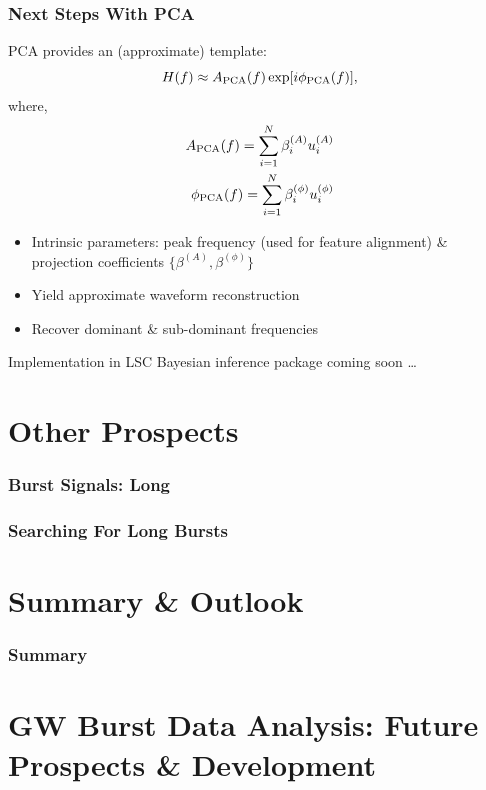 \documentclass[serif,mathserif,10pt]{beamer}
\let\oldframetitle\frametitle%
\renewcommand{\frametitle}[1]{%
      \oldframetitle{#1}\setstretch{1.2}}
\begin{document}
\begin{frame}
    \frametitle{Next Steps With PCA}

    PCA provides an (approximate) template:
    \begin{equation}
        H(f) \approx A_{\rm PCA}(f) \exp [i \phi_{\rm PCA}(f)],
    \end{equation}
    where,
    \begin{eqnarray}
        A_{\rm PCA}(f) = \sum_{i=1}^N \beta_i^{(A)}u_i^{(A)} \\ \nonumber
        \phi_{\rm PCA}(f) = \sum_{i=1}^N \beta_i^{(\phi)}u_i^{(\phi)} 
    \end{eqnarray}

    \begin{itemize}
        \item Intrinsic parameters: peak frequency (used for feature alignment)
            \& projection coefficients $\{\beta^{(A)}, \beta^{(\phi)}\}$
        \item Yield approximate waveform reconstruction \\
        \item Recover dominant \& sub-dominant frequencies \\
    \end{itemize}

    Implementation in LSC Bayesian inference package coming soon \dots

\end{frame}

\section{Other Prospects}

\begin{frame}
    \frametitle{Burst Signals: Long}
\end{frame}


\begin{frame}
    \frametitle{Searching For Long Bursts}
\end{frame}

\section{Summary \& Outlook}
\begin{frame}
    \frametitle{Summary}
\end{frame}

\appendix
\section{GW Burst Data Analysis: Future Prospects \& Development}
\end{document}
